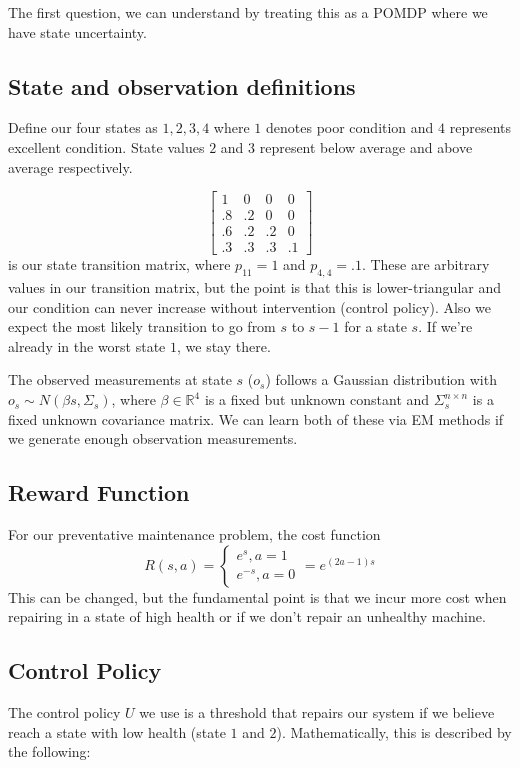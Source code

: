 \documentclass[english]{article}
\numberwithin{equation}{section}
\begin{document}
The first question, we can understand by treating this as a POMDP where we have state uncertainty.

\subsection{State and observation definitions}

Define our four states as $1,2,3,4$ where $1$ denotes poor condition and $4$ represents excellent condition. State values $2$ and $3$ represent below average and above average respectively.

$$
\begin{bmatrix}
1 & 0 & 0 & 0 \\
.8 & .2 & 0 & 0 \\
.6 & .2 & .2 & 0 \\
.3 & .3 & .3 & .1
\end{bmatrix}
$$ is our state transition matrix, where $p_{11}=1$ and $p_{4,4}=.1.$ These are arbitrary values in our transition matrix, but the point is that this is lower-triangular and our condition can never increase without intervention (control policy). Also we expect the most likely transition to go from $s$ to $s-1$ for a state $s$. If we're already in the worst state $1$, we stay there.

The observed measurements at state $s$ ($o_s$) follows a Gaussian distribution with $o_s\sim N(\beta s,\Sigma_s)$, where $\beta\in \mathbb{R}^4$ is a fixed but unknown constant and $\Sigma_s^{n\times n}$ is a fixed unknown covariance matrix. We can learn both of these via EM methods if we generate enough observation measurements.

\subsection{Reward Function}
For our preventative maintenance problem, the cost function $$R(s,a) = \begin{cases}
e^s, a=1 \\
e^{-s}, a=0
\end{cases} = e^{(2a-1)s}
$$
This can be changed, but the fundamental point is that we incur more cost when repairing in a state of high health or if we don't repair an unhealthy machine.

\subsection{Control Policy}
The control policy $U$ we use is a threshold that repairs our system if we believe reach a state with low health (state $1$ and $2$). Mathematically, this is described by the following:
\end{document}
